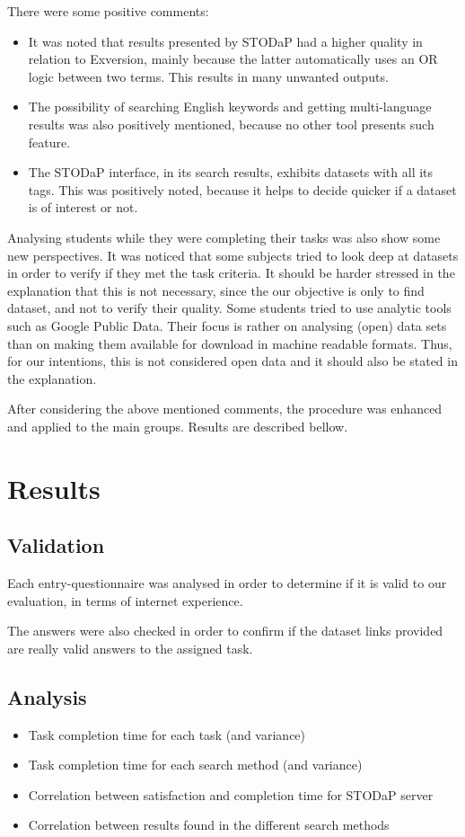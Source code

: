 There were some positive comments:
\begin{itemize}
	\item It was noted that results presented by STODaP had a higher quality in relation to Exversion, mainly because the latter automatically uses an OR logic between two terms.
	This results in many unwanted outputs.
	\item The possibility of searching English keywords and getting multi-language results was also positively mentioned, because no other tool presents such feature.
	\item The STODaP interface, in its search results, exhibits datasets with all its tags.
	This was positively noted, because it helps to decide quicker if a dataset is of interest or not.
\end{itemize}	

Analysing students while they were completing their tasks was also show some new perspectives.
It was noticed that some subjects tried to look deep at datasets in order to verify if they met the task criteria.
It should be harder stressed in the explanation that this is not necessary, since the our objective is only to find dataset, and not to verify their quality.
Some students tried to use analytic tools such as Google Public Data.
Their focus is rather on analysing (open) data sets than on making them available for download in machine readable formats.
Thus, for our intentions, this is not considered open data and it should also be stated in the explanation.

After considering the above mentioned comments, the procedure was enhanced and applied to the main groups.
Results are described bellow.

\section{Results}
\label{sec:eval_results}


\subsection{Validation}
Each entry-questionnaire was analysed in order to determine if it is valid to our evaluation, in terms of internet experience.

The answers were also checked in order to confirm if the dataset links provided are really valid answers to the assigned task.

\subsection{Analysis}
\begin{itemize}
	\item Task completion time for each task (and variance) \cite{Xu2009}
	\item Task completion time for each search method (and variance) \cite{Xu2009}
	\item Correlation between satisfaction and completion time for STODaP server \cite{Xu2009}
	\item Correlation between results found in the different search methods \cite{Vaughan2004}

\end{itemize}


